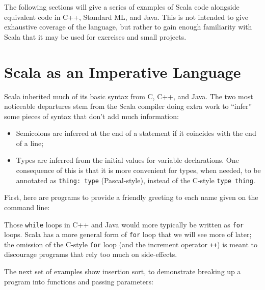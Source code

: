 \documentclass[11pt]{article}
\begin{document}
The following sections will give a series of examples of Scala code
alongside equivalent code in C++, Standard ML, and Java. This is
not intended to give exhaustive coverage of the language, but rather
to gain enough familiarity with Scala that it may be used for
exercises and small projects.

\section{Scala as an Imperative Language}
Scala inherited much of its basic syntax from C, C++, and Java. The
two most noticeable departures stem from the Scala compiler doing
extra work to ``infer'' some pieces of syntax that don't add much
information:
\begin{itemize}
\item Semicolons are inferred at the end of a statement if it
coincides with the end of a line;
\item Types are inferred from the initial values for variable
declarations. One consequence of this is that it is more convenient
for types, when needed, to be annotated as \verb|thing: type|
(Pascal-style), instead of the C-style \verb|type thing|.
\end{itemize}

First, here are programs to provide a friendly greeting to each
name given on the command line:

Those \texttt{while} loops in C++ and Java would more typically be
written as \texttt{for} loops. Scala has a more general form of
\texttt{for} loop that we will see more of later; the omission of
the C-style \texttt{for} loop (and the increment operator \verb|++|)
is meant to discourage programs that rely too much on side-effects.

The next set of examples show insertion sort, to demonstrate breaking
up a program into functions and passing parameters:
\end{document}
